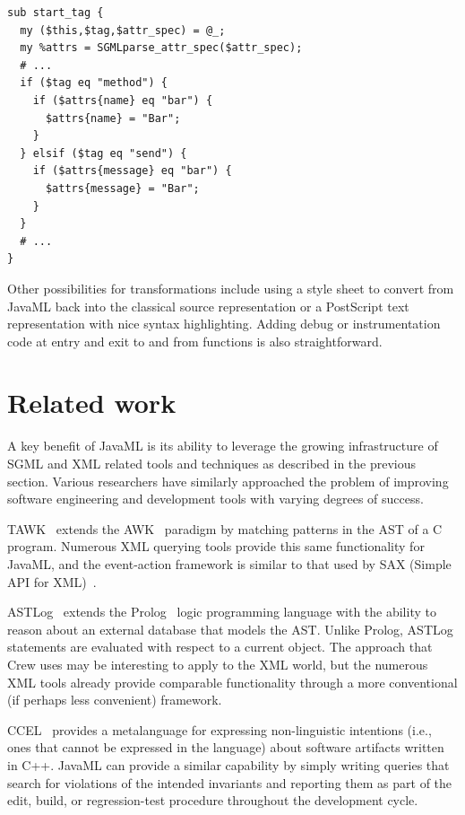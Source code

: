 \documentclass{article}
\begin{document}
\begin{verbatim}
sub start_tag { 
  my ($this,$tag,$attr_spec) = @_;
  my %attrs = SGMLparse_attr_spec($attr_spec);
  # ...
  if ($tag eq "method") {
    if ($attrs{name} eq "bar") {
      $attrs{name} = "Bar";
    }
  } elsif ($tag eq "send") {
    if ($attrs{message} eq "bar") {
      $attrs{message} = "Bar";
    }
  }
  # ...
}
\end{verbatim}

Other possibilities for transformations include using a style sheet to
convert from JavaML back into the classical source representation or a
PostScript text representation with nice syntax highlighting.  Adding
debug or instrumentation code at entry and exit to and from functions is
also straightforward.

\section{Related work}
\label{sec-related}

A key benefit of JavaML is its ability to leverage the growing
infrastructure of SGML and XML related tools and techniques as described
in the previous section.  Various researchers
have similarly approached the problem of 
improving software engineering and development
tools with varying degrees of success.

TAWK~\cite{TAWK} extends the AWK~\cite{AwkSed}
paradigm by matching patterns in the AST of a C program.  Numerous XML
querying tools provide this same functionality for JavaML, and the
event-action framework is similar to that used by SAX 
(Simple API for XML)~\cite{SAX}.

ASTLog~\cite{ASTLog} extends the Prolog~\cite{Prolog}
logic programming language with the ability to reason about an external
database that models the AST.  Unlike Prolog, ASTLog statements are
evaluated with respect to a current object.  The approach that Crew uses
may be interesting to apply to the XML world, but the numerous XML tools
already provide comparable functionality through a more conventional (if
perhaps less convenient) framework. 

CCEL~\cite{CCEL92} provides a metalanguage for expressing
non-linguistic intentions (i.e., ones that cannot be expressed in the
language) about software artifacts written in C++.  JavaML can provide a
similar capability by simply writing queries that search for violations
of the intended invariants and reporting them as part of the edit,
build, or regression-test procedure throughout the development cycle.
\end{document}
